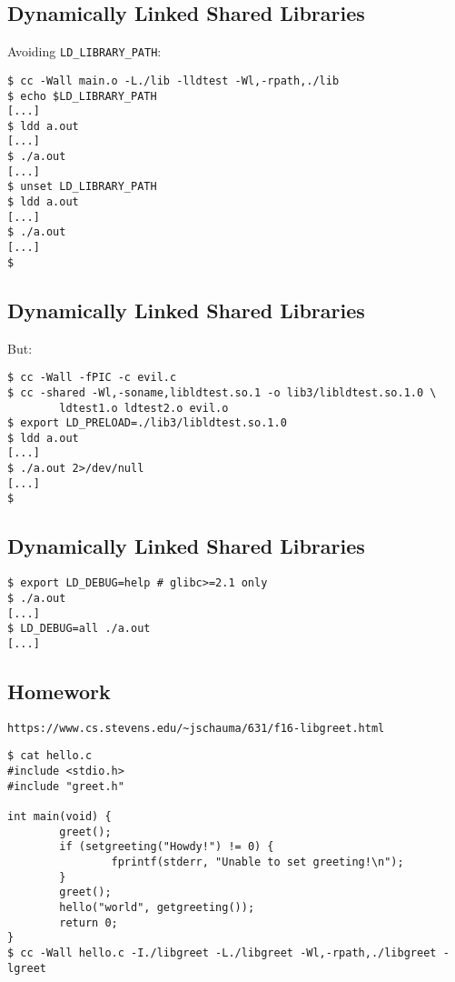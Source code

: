 \documentclass[xga]{xdvislides}
\begin{document}
\subsection{Dynamically Linked Shared Libraries}
Avoiding {\tt LD\_LIBRARY\_PATH}:
\begin{verbatim}
$ cc -Wall main.o -L./lib -lldtest -Wl,-rpath,./lib
$ echo $LD_LIBRARY_PATH
[...]
$ ldd a.out
[...]
$ ./a.out
[...]
$ unset LD_LIBRARY_PATH
$ ldd a.out
[...]
$ ./a.out
[...]
$
\end{verbatim}

\subsection{Dynamically Linked Shared Libraries}
But:
\begin{verbatim}
$ cc -Wall -fPIC -c evil.c
$ cc -shared -Wl,-soname,libldtest.so.1 -o lib3/libldtest.so.1.0 \
        ldtest1.o ldtest2.o evil.o
$ export LD_PRELOAD=./lib3/libldtest.so.1.0
$ ldd a.out
[...]
$ ./a.out 2>/dev/null
[...]
$
\end{verbatim}

\subsection{Dynamically Linked Shared Libraries}
\begin{verbatim}
$ export LD_DEBUG=help # glibc>=2.1 only
$ ./a.out
[...]
$ LD_DEBUG=all ./a.out
[...]
\end{verbatim}

\subsection{Homework}
\verb+https://www.cs.stevens.edu/~jschauma/631/f16-libgreet.html+ \\

\begin{verbatim}
$ cat hello.c
#include <stdio.h>
#include "greet.h"

int main(void) {
        greet();
        if (setgreeting("Howdy!") != 0) {
                fprintf(stderr, "Unable to set greeting!\n");
        }
        greet();
        hello("world", getgreeting());
        return 0;
}
$ cc -Wall hello.c -I./libgreet -L./libgreet -Wl,-rpath,./libgreet -lgreet
\end{verbatim}
\end{document}
